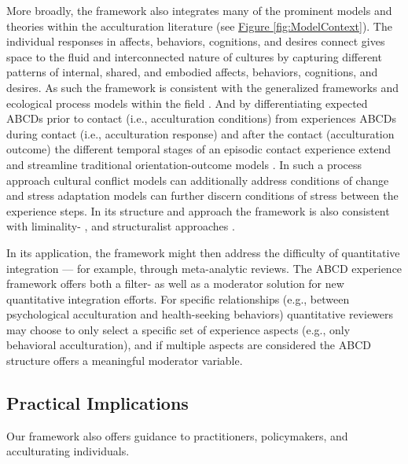\documentclass[man, 12pt, a4paper, mask]{apa7}
\newcommand{\fgrref}[2][]{\hyperref[#2]{Figure \ref*{#2}#1}}
\begin{document}
More broadly, the framework also integrates many of the prominent models and theories within the acculturation literature (see \fgrref{fig:ModelContext}). The individual responses in affects, behaviors, cognitions, and desires connect gives space to the fluid and interconnected nature of cultures by capturing different patterns of internal, shared, and embodied affects, behaviors, cognitions, and desires. As such the framework is consistent with the generalized frameworks \citep[e.g.,][]{Berry2005, Cross1991} and ecological process models within the field \citep[e.g.,][]{Ward2016, Serdarevic2005, Mistry2010}. And by differentiating expected ABCDs prior to contact (i.e., acculturation conditions) from experiences ABCDs during contact (i.e., acculturation response) and after the contact (acculturation outcome) the different temporal stages of an episodic contact experience extend and streamline traditional orientation-outcome models \citep[e.g.,][]{Arends-Toth2006a, TeLindert2008a}. In such a process approach cultural conflict models can additionally address conditions of change \citep[e.g.,][]{Robinson2019} and stress adaptation models can further discern conditions of stress \citep[e.g.,][]{Kim1988, Hajro2019, Sam2006b} between the experience steps. In its structure and approach the framework is also consistent with liminality- \citep[e.g.,][]{Loon2021, Baird2015}, and structuralist approaches \citep[e.g.,][]{Kemppainen2020}.

In its application, the framework might then address the difficulty of quantitative integration --- for example, through meta-analytic reviews. The ABCD experience framework offers both a filter- as well as a moderator solution for new quantitative integration efforts. For specific relationships (e.g., between psychological acculturation and health-seeking behaviors) quantitative reviewers may choose to only select a specific set of experience aspects (e.g., only behavioral acculturation), and if multiple aspects are considered the ABCD structure offers a meaningful moderator variable. 

\subsection{Practical Implications}
Our framework also offers guidance to practitioners, policymakers, and acculturating individuals. 

\end{document}
